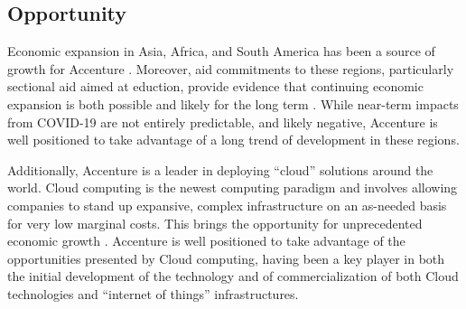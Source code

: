 \subsection{Opportunity}

Economic expansion in Asia, Africa, and South America has been a source of growth for Accenture \parencite{AccenturePLC2019}. Moreover, aid commitments to these regions, particularly sectional aid aimed at eduction, provide evidence that continuing economic expansion is both possible and likely for the long term \parencite{marutaForeignAidInstitutional2020}. While near-term impacts from COVID-19 are not entirely predictable, and likely negative, Accenture is well positioned to take advantage of a long trend of development in these regions.

Additionally, Accenture is a leader in deploying ``cloud'' solutions around the world. Cloud computing is the newest computing paradigm and involves allowing companies to stand up expansive, complex infrastructure on an as-needed basis for very low marginal costs. This brings the opportunity for unprecedented economic growth \parencite{asaduzzamanGeospatialCyberinfrastructureRegional2020}. Accenture is well positioned to take advantage of the opportunities presented by Cloud computing, having been a key player in both the initial development of the technology and of commercialization of both Cloud technologies and ``internet of things'' infrastructures.
